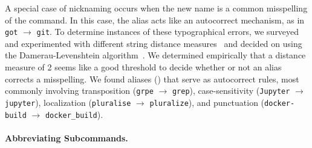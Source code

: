 \documentclass[smallextended,natbib]{svjour3}
\newcommand{\num}[1]{\numprint{#1}}
\newcommand{\per}[1]{\numprint[\%]{#1}}
\newcommand{\alias}[2]{{\texttt{#1} $\rightarrow$ \texttt{#2}}}
\begin{document}
A special case of nicknaming occurs when the new name is a common misspelling of the command.
In this case, the alias acts like an autocorrect mechanism, as in \alias{got}{git}.
To determine instances of these typographical errors, we surveyed and experimented with different string distance measures~\cite{navarro:01} and decided on using the Damerau-Levenshtein algorithm~\citep{damerau:64}.
We determined empirically that a distance measure of 2 seems like a good threshold to decide whether or not an alias corrects a misspelling.
We found \num{9195} aliases (\per{0.42}) that serve as autocorrect rules, most commonly involving transposition (\alias{grpe}{grep}), case-sensitivity (\alias{Jupyter}{jupyter}), localization (\alias{pluralise}{pluralize}), and punctuation (\alias{docker-build}{docker\_build}).


\paragraph{Abbreviating Subcommands.}
\end{document}
